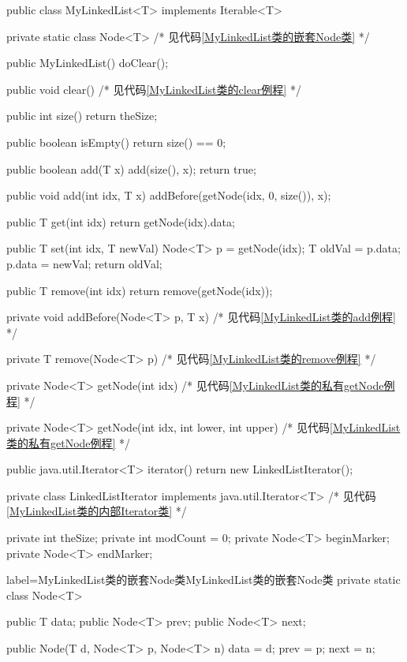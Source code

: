 \documentclass[oneside]{ctexbook}
\begin{document}
\begin{myjava}{}{}
public class MyLinkedList<T> implements Iterable<T> {
    private static class Node<T> {
        /* 见代码\ref{MyLinkedList类的嵌套Node类} */
    }

    public MyLinkedList() {
        doClear();
    }

    public void clear() {
        /* 见代码\ref{MyLinkedList类的clear例程} */
    }

    public int size() {
        return theSize;
    }

    public boolean isEmpty() {
        return size() == 0;
    }

    public boolean add(T x) {
        add(size(), x);
        return true;
    }

    public void add(int idx, T x) {
        addBefore(getNode(idx, 0, size()), x);
    }

    public T get(int idx) {
        return getNode(idx).data;
    }

    public T set(int idx, T newVal) {
        Node<T> p = getNode(idx);
        T oldVal = p.data;
        p.data = newVal;
        return oldVal;
    }

    public T remove(int idx) {
        return remove(getNode(idx));
    }

    private void addBefore(Node<T> p, T x) {
        /* 见代码\ref{MyLinkedList类的add例程} */
    }

    private T remove(Node<T> p) {
        /* 见代码\ref{MyLinkedList类的remove例程} */
    }

    private Node<T> getNode(int idx) {
        /* 见代码\ref{MyLinkedList类的私有getNode例程} */
    }

    private Node<T> getNode(int idx, int lower, int upper) {
        /* 见代码\ref{MyLinkedList类的私有getNode例程} */
    }

    public java.util.Iterator<T> iterator() {
        return new LinkedListIterator();
    }

    private class LinkedListIterator implements java.util.Iterator<T> {
        /* 见代码\ref{MyLinkedList类的内部Iterator类} */
    }

    private int theSize;
    private int modCount = 0;
    private Node<T> beginMarker;
    private Node<T> endMarker;
}
\end{myjava}

\begin{myjava}{label={MyLinkedList类的嵌套Node类}}{MyLinkedList类的嵌套Node类}
private static class Node<T> {
    public T data;
    public Node<T> prev;
    public Node<T> next;

    public Node(T d, Node<T> p, Node<T> n) {
        data = d;
        prev = p;
        next = n;
    }
}
\end{myjava}
\end{document}
